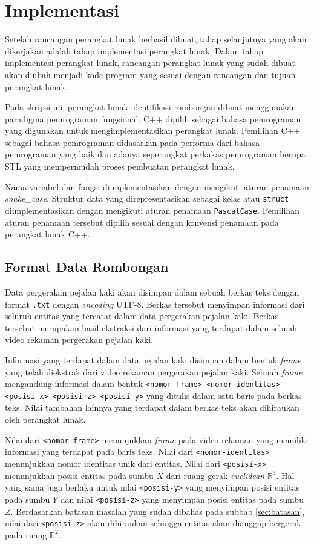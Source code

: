 \chapter{Implementasi}
\label{chap:implementasi}

Setelah rancangan perangkat lunak berhasil dibuat, tahap selanjutnya yang akan dikerjakan adalah tahap implementasi perangkat lunak. Dalam tahap implementasi perangkat lunak, rancangan perangkat lunak yang sudah dibuat akan diubah menjadi kode program yang sesuai dengan rancangan dan tujuan perangkat lunak.

Pada skripsi ini, perangkat lunak identifikasi rombongan dibuat menggunakan paradigma pemrograman fungsional. C++ dipilih sebagai bahasa pemrograman yang digunakan untuk mengimplementasikan perangkat lunak. Pemilihan C++ sebagai bahasa pemrograman didasarkan pada performa dari bahasa pemrograman yang baik dan adanya seperangkat perkakas pemrograman berupa STL yang mempermudah proses pembuatan perangkat lunak.

Nama variabel dan fungsi diimplementasikan dengan mengikuti aturan penamaan \textit{snake\_case}. Struktur data yang direpresentasikan sebagai kelas atau \texttt{struct} diimplementasikan dengan mengikuti aturan penamaan \texttt{PascalCase}. Pemilihan aturan penamaan tersebut dipilih sesuai dengan konvensi penamaan pada perangkat lunak C++.

\section{Format Data Rombongan}
\label{sec:input-structure}

Data pergerakan pejalan kaki akan disimpan dalam sebuah berkas teks dengan format \texttt{.txt} dengan \textit{encoding} UTF-8. Berkas tersebut menyimpan informasi dari seluruh entitas yang tercatat dalam data pergerakan pejalan kaki. Berkas tersebut merupakan hasil ekstraksi dari informasi yang terdapat dalam sebuah video rekaman pergerakan pejalan kaki.

Informasi yang terdapat dalam data pejalan kaki disimpan dalam bentuk \textit{frame} yang telah diekstrak dari video rekaman pergerakan pejalan kaki. Sebuah \textit{frame} mengandung informasi dalam bentuk \texttt{<nomor-frame> <nomor-identitas> <posisi-x> <posisi-z> <posisi-y>} yang ditulis dalam satu baris pada berkas teks. Nilai tambahan lainnya yang terdapat dalam berkas teks akan dihiraukan oleh perangkat lunak.

Nilai dari \texttt{<nomor-frame>} menunjukkan \textit{frame} pada video rekaman yang memiliki informasi yang terdapat pada baris teks. Nilai dari \texttt{<nomor-identitas>} menunjukkan nomor identitas unik dari entitas. Nilai dari \texttt{<posisi-x>} menunjukkan posisi entitas pada sumbu $X$ dari ruang gerak \textit{euclidean} $\mathbb{R}^3$. Hal yang sama juga berlaku untuk nilai \texttt{<posisi-y>} yang menyimpan posisi entitas pada sumbu $Y$ dan nilai \texttt{<posisi-z>} yang menyimpan posisi entitas pada sumbu $Z$. Berdasarkan batasan masalah yang sudah dibahas pada subbab \ref{sec:batasan}, nilai dari \texttt{<posisi-z>} akan dihiraukan sehingga entitas akan dianggap bergerak pada ruang $\mathbb{R}^2$.

